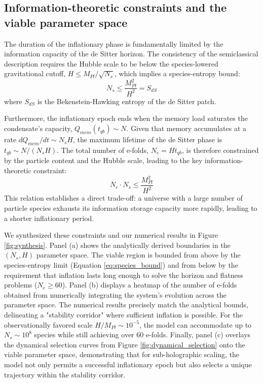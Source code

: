 \documentclass[]{article}
\begin{document}
\subsection{Information-theoretic constraints and the viable parameter space}
The duration of the inflationary phase is fundamentally limited by the information capacity of the de Sitter horizon. The consistency of the semiclassical description requires the Hubble scale to be below the species-lowered gravitational cutoff, $H \leq M_{Pl}/\sqrt{N_s}$, which implies a species-entropy bound:
\begin{equation}
    N_s \leq \frac{M_{Pl}^2}{H^2} = S_{dS}
    \label{eq:species_bound}
\end{equation}
where $S_{dS}$ is the Bekenstein-Hawking entropy of the de Sitter patch.

Furthermore, the inflationary epoch ends when the memory load saturates the condensate's capacity, $Q_{mem}(t_{qb}) \sim N$. Given that memory accumulates at a rate $dQ_{mem}/dt \sim N_s H$, the maximum lifetime of the de Sitter phase is $t_{qb} \sim N/(N_s H)$. The total number of e-folds, $N_e = H t_{qb}$, is therefore constrained by the particle content and the Hubble scale, leading to the key information-theoretic constraint:
\begin{equation}
    N_e \cdot N_s \leq \frac{M_{Pl}^2}{H^2}
    \label{eq:NeNs_constraint}
\end{equation}
This relation establishes a direct trade-off: a universe with a large number of particle species exhausts its information storage capacity more rapidly, leading to a shorter inflationary period.

We synthesized these constraints and our numerical results in Figure \ref{fig:synthesis}. Panel (a) shows the analytically derived boundaries in the $(N_s, H)$ parameter space. The viable region is bounded from above by the species-entropy limit (Equation \ref{eq:species_bound}) and from below by the requirement that inflation lasts long enough to solve the horizon and flatness problems ($N_e \geq 60$). Panel (b) displays a heatmap of the number of e-folds obtained from numerically integrating the system's evolution across the parameter space. The numerical results precisely match the analytical bounds, delineating a "stability corridor" where sufficient inflation is possible. For the observationally favored scale $H/M_{Pl} \sim 10^{-5}$, the model can accommodate up to $N_s \sim 10^8$ species while still achieving over 60 e-folds. Finally, panel (c) overlays the dynamical selection curves from Figure \ref{fig:dynamical_selection} onto the viable parameter space, demonstrating that for sub-holographic scaling, the model not only permits a successful inflationary epoch but also selects a unique trajectory within the stability corridor.
\end{document}

